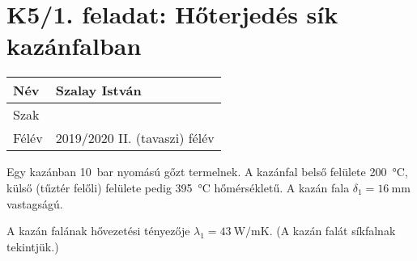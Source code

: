 

\section*{K5/1. feladat: Hőterjedés sík kazánfalban}

\begin{tabular}{ | p{2cm} | p{14cm} | } 
	\hline
	Név & Szalay István \\ 
	\hline
	Szak & \\ 
	\hline
	Félév & 2019/2020 II. (tavaszi) félév \\ 
	\hline
\end{tabular}
\vspace{0.5cm}

\noindent Egy kazánban \SI{10}{\bar} nyomású gőzt termelnek. A kazánfal belső felülete \SI{200}{\celsius}, külső (tűztér felőli) felülete pedig \SI{395}{\celsius} hőmérsékletű. A kazán fala $\delta_1 = \SI{16}{\milli\meter}$ vastagságú.

\vspace{2mm}
\noindent  A kazán falának hővezetési tényezője $\lambda_1 = \SI{43}{\watt\per\meter\kelvin}$. (A kazán falát síkfalnak tekintjük.)

